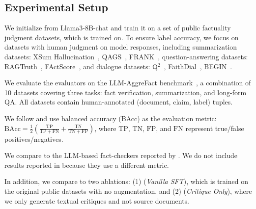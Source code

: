 \subsection{Experimental Setup}
We initialize \fencemodelname from Llama3-8B-chat and train it on a set of public factuality judgment datasets, which \citet{FLAMe} is trained on.
To ensure label accuracy, we focus on datasets with human judgment on model responses, including summarization datasets: XSum Hallucination~\citep{xsum-hallucination}, QAGS~\citep{QAGS}, FRANK~\citep{FRANK}, question-answering datasets: RAGTruth~\citep{ragtruth}, FActScore~\citep{factscore}, and dialogue datasets: Q$^2$~\citep{Q2}, FaithDial~\citep{faithdial}, BEGIN~\citep{begin}.


We evaluate the evaluators on the LLM-AggreFact benchmark~\citep{llm-aggrefact}, a combination of 10 datasets covering three tasks: fact verification, summarization, and long-form QA.
All datasets contain human-annotated (document, claim, label) tuples. 

We follow \citet{llm-aggrefact} and use balanced accuracy (BAcc) as the evaluation metric: $\text{BAcc} = \frac{1}{2}\left(\frac{\mathrm{TP}}{\mathrm{TP}+\mathrm{FN}}+\frac{\mathrm{TN}}{\mathrm{TN}+\mathrm{FP}}\right)$, where $\mathrm{TP}$, $\mathrm{TN}$, $\mathrm{FP}$, and $\mathrm{FN}$ represent true/false positives/negatives. 


We compare to the LLM-based fact-checkers reported by \citet{llm-aggrefact}.
We do not include results reported in \citet{FLAMe} because they use a different metric.

In addition, we compare to two ablations: (1) \fencemodelname (\textit{Vanilla SFT}), which is trained on the original public datasets with no augmentation, and (2) \fencemodelname (\textit{Critique Only}), where we only generate textual critiques and not source documents.


